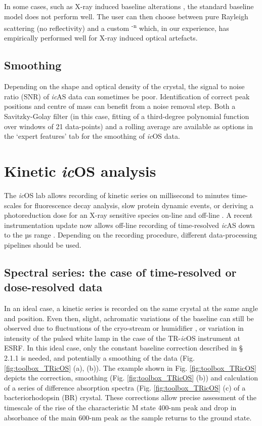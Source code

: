 In some cases, such as X-ray induced baseline alterations \parencite{boltonRedoxSwitchAllows2024}, the standard baseline model does not perform well. The user can then choose between pure Rayleigh scattering (no reflectivity) and a custom \textlambda \textsuperscript{-n} which, in our experience, has empirically performed well for X-ray induced optical artefacts. 

\subsection{Smoothing}
Depending on the shape and optical density of the crystal, the signal to noise ratio (SNR) of \textit{ic}AS data can sometimes be poor. Identification of correct peak positions and centre of mass can benefit from a noise removal step. Both a Savitzky-Golay filter (in this case, fitting of a third-degree polynomial function over windows of 21 data-points) and a rolling average are available as options in the ‘expert features’ tab for the smoothing of \textit{ic}OS data.  


\section{Kinetic \textit{ic}OS analysis}

The \textit{ic}OS lab allows recording of kinetic series on millisecond to minutes time-scales for fluorescence decay analysis, slow protein dynamic events, or deriving a photoreduction dose for an X-ray sensitive species on-line \parencite{boltonRedoxSwitchAllows2024} and off-line \parencite{aumonierSlowProteinDynamics2022}. A recent instrumentation update now allows off-line recording of time-resolved \textit{ic}AS down to the µs range \parencite{engilbergeTRicOSSetupESRF2024}. Depending on the recording procedure, different data-processing pipelines should be used. 

\subsection{Spectral series: the case of time-resolved or dose-resolved data}

In an ideal case, a kinetic series is recorded on the same crystal at the same angle and position. Even then, slight, achromatic variations of the baseline can still be observed due to fluctuations of the cryo-stream or humidifier \parencite{sanchez-weatherbyImprovingDiffractionHumidity2009}, or variation in intensity of the pulsed white lamp in the case of the TR-\textit{ic}OS instrument at ESRF. In this ideal case, only the constant baseline correction described in § 2.1.1 is needed, and potentially a smoothing of the data (Fig. \ref{fig:toolbox_TRicOS} (a), (b)). The example shown in Fig. \ref{fig:toolbox_TRicOS} depicts the correction, smoothing (Fig. \ref{fig:toolbox_TRicOS} (b)) and calculation of a series of difference absorption spectra (Fig. \ref{fig:toolbox_TRicOS} (c) of a bacteriorhodopsin (BR) crystal. These corrections allow precise assessment of the timescale of the rise of the characteristic M state 400-nm peak \parencite{efremovTimeResolvedMicrospectroscopySingle2006} and drop in absorbance of the main 600-nm peak as the sample returns to the ground state. 

